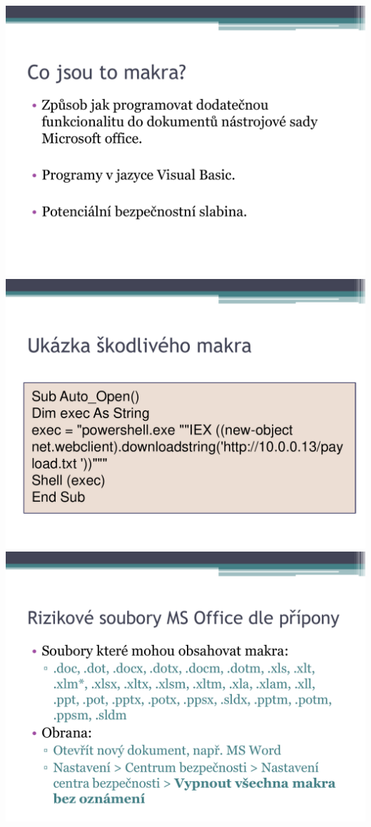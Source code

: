 \documentclass[a4paper, 12pt]{article}
\begin{document}
\vspace{0.5in}
\includegraphics[scale=0.5]{MacroSlides/p04.pdf} \\
\vspace{0.5in}
\includegraphics[scale=0.5]{MacroSlides/p05.pdf} \\
\vspace{0.5in}
\includegraphics[scale=0.5]{MacroSlides/p06.pdf} \\
\end{document}
